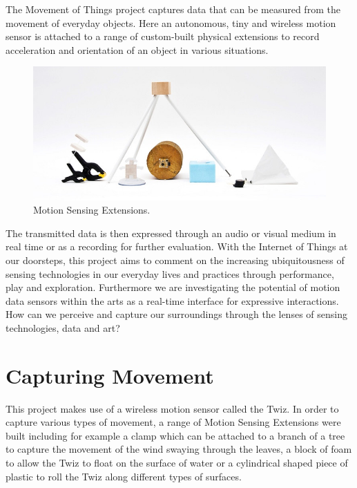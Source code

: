 \documentclass{sigchi}
\begin{document}
The Movement of Things project captures data that can
be measured from the movement of everyday objects.
Here an autonomous, tiny and wireless motion sensor
is attached to a range of custom-built physical
extensions to record acceleration and orientation of an
object in various situations.

\begin{figure}[H]
\centering
\includegraphics[width=\columnwidth]{pics/extensions}
\caption{Motion Sensing Extensions.}
\label{fig:extensions}
\end{figure}

The transmitted data is
then expressed through an audio or visual medium in
real time or as a recording for further evaluation. With
the Internet of Things at our doorsteps, this project
aims to comment on the increasing ubiquitousness of
sensing technologies in our everyday lives and practices
through performance, play and exploration.
Furthermore we are investigating the potential of
motion data sensors within the arts as a real-time
interface for expressive interactions. How can we
perceive and capture our surroundings through the
lenses of sensing technologies, data and art?

\section{Capturing Movement}

This project makes use of a wireless motion sensor
called the Twiz\cite{twiz}. In order to capture various types of
movement, a range of Motion Sensing Extensions were
built including for example a clamp which can be
attached to a branch of a tree to capture the movement
of the wind swaying through the leaves, a block of
foam to allow the Twiz to float on the surface of water
or a cylindrical shaped piece of plastic to roll the Twiz
along different types of surfaces.
\end{document}
